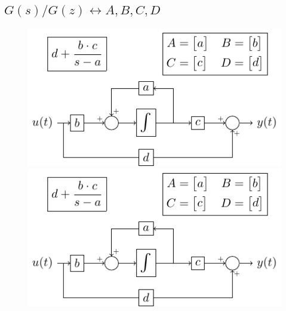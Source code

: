 \documentclass[resume]{subfiles}
\begin{document}
\subsection{$G(s) / G(z) \longleftrightarrow A,B,C,D$}
\begin{figure}[H]
\centering
\includegraphics[scale=1,page=1]{drwg_1.pdf}\\
\includegraphics[scale=1,page=2]{drwg_1.pdf}
\end{figure}
\end{document}
